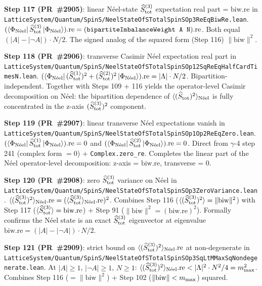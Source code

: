 \documentclass[a4paper,11pt]{article}
\begin{document}
\textbf{Step 117 (PR~\#2905)}: linear N\'eel-state
$\widehat S_{\rm tot}^{(3)}$ expectation real part = $\mathrm{biw.re}$
in
\texttt{LatticeSystem/Quantum/SpinS/NeelStateOfSTotalSpinSOp3ReEqBiwRe.lean}.
$(\langle\Phi_{\rm N\acute{e}el} |\,\widehat S_{\rm tot}^{(3)}\,
   | \Phi_{\rm N\acute{e}el}\rangle).\mathrm{re} =
   (\texttt{bipartiteImbalanceWeight A N}).\mathrm{re}$.
Both equal $(|A|-|\neg A|)\cdot N/2$. The signed analog of the
squared form (Step 116) $\|\mathrm{biw}\|^2$.

\textbf{Step 118 (PR~\#2906)}: transverse Casimir N\'eel
expectation real part in
\texttt{LatticeSystem/Quantum/SpinS/NeelStateOfSTotalSpinSOp12SqReEqHalfCardTimesN.lean}.
$(\langle\Phi_{\rm N\acute{e}el} |\,(\widehat S_{\rm tot}^{(1)})^2
  + (\widehat S_{\rm tot}^{(2)})^2\,| \Phi_{\rm N\acute{e}el}\rangle
   ).\mathrm{re} = |\Lambda|\cdot N/2$.
Bipartition-independent. Together with Steps 109 + 116 yields the
operator-level Casimir decomposition on N\'eel: the bipartition
dependence of $\langle(\widehat S_{\rm tot})^2\rangle_{\rm N\acute{e}el}$
is fully concentrated in the z-axis $(\widehat S_{\rm tot}^{(3)})^2$
component.

\textbf{Step 119 (PR~\#2907)}: linear transverse N\'eel expectations
vanish in
\texttt{LatticeSystem/Quantum/SpinS/NeelStateOfSTotalSpinSOp1Op2ReEqZero.lean}.
$(\langle\Phi_{\rm N\acute{e}el} |\,\widehat S_{\rm tot}^{(1)}\,
   | \Phi_{\rm N\acute{e}el}\rangle).\mathrm{re} = 0$ and
$(\langle\Phi_{\rm N\acute{e}el} |\,\widehat S_{\rm tot}^{(2)}\,
   | \Phi_{\rm N\acute{e}el}\rangle).\mathrm{re} = 0$.
Direct from $\gamma$-4 step 241 (complex form $= 0$) +
\texttt{Complex.zero\_re}. Completes the linear part of the N\'eel
operator-level decomposition: z-axis = $\mathrm{biw.re}$, transverse = 0.

\textbf{Step 120 (PR~\#2908)}: zero $\widehat S_{\rm tot}^{(3)}$
variance on N\'eel in
\texttt{LatticeSystem/Quantum/SpinS/NeelStateOfSTotalSpinSOp3ZeroVariance.lean}.
$\langle(\widehat S_{\rm tot}^{(3)})^2\rangle_{\rm N\acute{e}el}.\mathrm{re}
   = (\langle\widehat S_{\rm tot}^{(3)}\rangle_{\rm N\acute{e}el}.\mathrm{re})^2$.
Combines Step 116 ($\langle(\widehat S_{\rm tot}^{(3)})^2\rangle =
\|\mathrm{biw}\|^2$) with Step 117 ($\langle\widehat S_{\rm tot}^{(3)}\rangle =
\mathrm{biw.re}$) + Step 91 ($\|\mathrm{biw}\|^2 = (\mathrm{biw.re})^2$).
Formally confirms the N\'eel state is an exact $\widehat S_{\rm tot}^{(3)}$
eigenvector at eigenvalue $\mathrm{biw.re} = (|A|-|\neg A|)\cdot N/2$.

\textbf{Step 121 (PR~\#2909)}: strict bound on
$\langle(\widehat S_{\rm tot}^{(3)})^2\rangle_{\rm N\acute{e}el}.\mathrm{re}$
at non-degenerate in
\texttt{LatticeSystem/Quantum/SpinS/NeelStateOfSTotalSpinSOp3SqLtMMaxSqNondegenerate.lean}.
At $|A| \ge 1$, $|\neg A| \ge 1$, $N \ge 1$:
$\langle(\widehat S_{\rm tot}^{(3)})^2\rangle_{\rm N\acute{e}el}.\mathrm{re}
   < |\Lambda|^2\cdot N^2/4 = m_{\rm max}^2$.
Combines Step 116 ($= \|\mathrm{biw}\|^2$) + Step 102
($\|\mathrm{biw}\| < m_{\rm max}$) squared.
\end{document}
